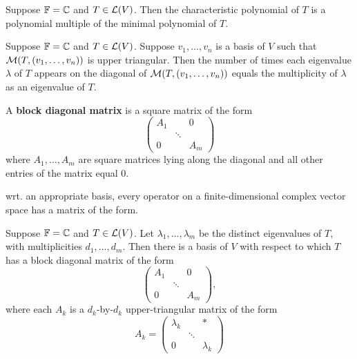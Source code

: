 \documentclass{extarticle}
\begin{document}
\begin{corollary}
    Suppose \(\mathbb{F} = \mathbb{C}\) and \(T \in \mathcal{L}(V)\). Then the characteristic polynomial of \(T\) is 
    a polynomial multiple of the minimal polynomial of \(T\).
\end{corollary}

\begin{thm}
    Suppose \(\mathbb{F} = \mathbb{C}\) and \(T \in \mathcal{L}(V)\). Suppose \(v_1, \ldots, v_n\) is a basis of 
    \(V\) such that \(\mathcal{M}(T, (v_1, \ldots, v_n))\) is upper triangular. Then the number 
    of times each eigenvalue \(\lambda\) of \(T\) appears on the diagonal of 
    \(\mathcal{M}(T, (v_1, \ldots, v_n))\) equals the multiplicity of \(\lambda\) as an eigenvalue 
    of \(T\).
\end{thm}

\begin{definition}
    A \textbf{block diagonal matrix} is a square matrix of the form 
    \[\begin{pmatrix}
        A_1 & & 0 \\ 
        & \ddots &  \\ 
        0 & & A_m 
    \end{pmatrix}\]
    where \(A_1, \ldots, A_m\) are square matrices lying along the diagonal and all other 
    entries of the matrix equal 0.
\end{definition}

\begin{remark}
    wrt. an appropriate basis, every operator on a finite-dimensional complex vector space 
    has a matrix of the form. 
\end{remark}

\begin{thm}
    Suppose \(\mathbb{F} = \mathbb{C}\) and \(T \in \mathcal{L}(V)\). Let \(\lambda_1, \ldots, \lambda_m\) be the 
    distinct eigenvalues of \(T\), with multiplicities \(d_1, \ldots, d_m\). Then there is a basis 
    of \(V\) with respect to which \(T\) has a block diagonal matrix of the form
    \[\begin{pmatrix}
        A_1 & & 0 \\ 
        & \ddots & \\ 
        0 & & A_m 
    \end{pmatrix},\]
    where each \(A_k\) is a \(d_k\)-by-\(d_k\) upper-triangular matrix of the form 
    \[ 
        A_k = \begin{pmatrix}
            \lambda_k & & * \\ 
            & \ddots & \\ 
            0 & & \lambda_k
        \end{pmatrix}  \]
\end{thm}
\end{document}
